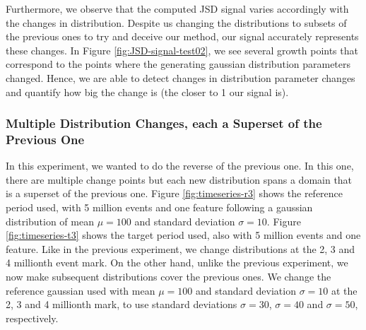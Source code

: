 Furthermore, we observe that the computed JSD signal varies accordingly with the changes in distribution. Despite us changing the distributions to subsets of the previous ones to try and deceive our method, our signal accurately represents these changes. In Figure \ref{fig:JSD-signal-test02}, we see several growth points that correspond to the points where the generating gaussian distribution parameters changed. Hence, we are able to detect changes in distribution parameter changes and quantify how big the change is (the closer to 1 our signal is).

\subsubsection{Multiple Distribution Changes, each a Superset of the Previous One}
In this experiment, we wanted to do the reverse of the previous one. In this one, there are multiple change points but each new distribution spans a domain that is a superset of the previous one. Figure \ref{fig:timeseries-r3} shows the reference period used, with 5 million events and one feature following a gaussian distribution of mean $\mu=100$ and standard deviation $\sigma=10$. Figure \ref{fig:timeseries-t3} shows the target period used, also with 5 million events and one feature. Like in the previous experiment, we change distributions at the 2, 3 and 4 millionth event mark. On the other hand, unlike the previous experiment, we now make subsequent distributions cover the previous ones. We change the reference gaussian used with mean $\mu=100$ and standard deviation $\sigma=10$ at the 2, 3 and 4 millionth mark, to use standard deviations $\sigma=30$, $\sigma=40$ and $\sigma=50$, respectively.
